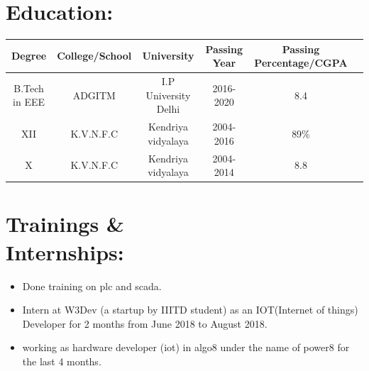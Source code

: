 \documentclass[10pt]{report}
\begin{document}
\section*{Education:}
\begin{center}
	\begin{tabular}{|c|c|c|c|c|c|}
		\hline
		\hspace{2pt}\large\textbf{Degree} \hspace{2pt} & \hspace{2pt}\large\textbf{College/School}\hspace{2pt} &\hspace{2pt} \large\textbf{University}\hspace{2pt} &\hspace{2pt}\large\textbf{Passing Year}\hspace{2pt} & \hspace{2pt}\large\textbf{Passing Percentage/CGPA}\hspace{2pt}\\
		\hline
		B.Tech in EEE & ADGITM & I.P University Delhi & 2016-2020 & 8.4 \\
		XII & K.V.N.F.C & Kendriya vidyalaya & 2004-2016 & 89\%\\
		X & K.V.N.F.C & Kendriya vidyalaya & 2004-2014 & 8.8\\ 
		\hline
	\end{tabular}
\end{center}

\section*{Trainings \&\\ Internships:}
\begin{itemize}
	\item Done training on plc and scada.
	\item Intern at W3Dev (a startup by IIITD student) as an IOT(Internet of things) Developer for 2 months from June 2018 to August 2018.
	\item working as hardware developer (iot) in algo8 under the name of power8 for the last 4 months.
\end{itemize}
\end{document}
